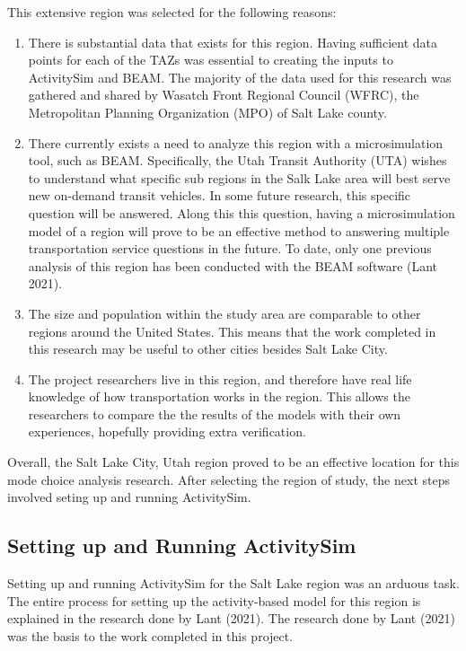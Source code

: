 \documentclass[12pt, oneside, openright]{byuthesis}
\providecommand{\tightlist}{%
  \setlength{\itemsep}{0pt}\setlength{\parskip}{0pt}}
\begin{document}
This extensive region was selected for the following reasons:

\begin{enumerate}
\def\labelenumi{\arabic{enumi}.}
\tightlist
\item
  There is substantial data that exists for this region. Having sufficient data points for each of the TAZs was essential to creating the inputs to ActivitySim and BEAM. The majority of the data used for this research was gathered and shared by Wasatch Front Regional Council (WFRC), the Metropolitan Planning Organization (MPO) of Salt Lake county.
\item
  There currently exists a need to analyze this region with a microsimulation tool, such as BEAM. Specifically, the Utah Transit Authority (UTA) wishes to understand what specific sub regions in the Salk Lake area will best serve new on-demand transit vehicles. In some future research, this specific question will be answered. Along this this question, having a microsimulation model of a region will prove to be an effective method to answering multiple transportation service questions in the future. To date, only one previous analysis of this region has been conducted with the BEAM software (Lant 2021).
\item
  The size and population within the study area are comparable to other regions around the United States. This means that the work completed in this research may be useful to other cities besides Salt Lake City.
\item
  The project researchers live in this region, and therefore have real life knowledge of how transportation works in the region. This allows the researchers to compare the the results of the models with their own experiences, hopefully providing extra verification.
\end{enumerate}

Overall, the Salt Lake City, Utah region proved to be an effective location for this mode choice analysis research. After selecting the region of study, the next steps involved seting up and running ActivitySim.

\hypertarget{setting-up-and-running-activitysim}{%
\subsection{Setting up and Running ActivitySim}\label{setting-up-and-running-activitysim}}

Setting up and running ActivitySim for the Salt Lake region was an arduous task. The entire process for setting up the activity-based model for this region is explained in the research done by Lant (2021). The research done by Lant (2021) was the basis to the work completed in this project.
\end{document}
